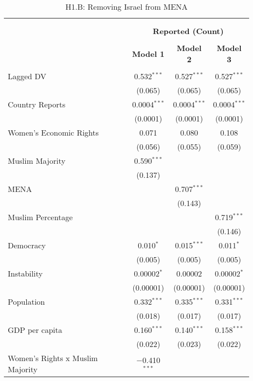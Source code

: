 
\begin{table}[!htbp] \centering 
  \caption{H1.B: Removing Israel from MENA} 
  \label{} 
\begin{tabular}{@{\extracolsep{5pt}}lccc} 
\\[-1.8ex]\hline \\[-1.8ex] 
\\[-1.8ex] & \multicolumn{3}{c}{\textbf{Reported (Count)}} \\ 
\\[-1.8ex] & \textbf{Model 1} & \textbf{Model 2} & \textbf{Model 3}\\ 
\hline \\[-1.8ex] 
 Lagged DV & 0.532$^{***}$ & 0.527$^{***}$ & 0.527$^{***}$ \\ 
  & (0.065) & (0.065) & (0.065) \\ 
  Country Reports & 0.0004$^{***}$ & 0.0004$^{***}$ & 0.0004$^{***}$ \\ 
  & (0.0001) & (0.0001) & (0.0001) \\ 
  Women's Economic Rights & 0.071 & 0.080 & 0.108 \\ 
  & (0.056) & (0.055) & (0.059) \\ 
  Muslim Majority & 0.590$^{***}$ &  &  \\ 
  & (0.137) &  &  \\ 
  MENA &  & 0.707$^{***}$ &  \\ 
  &  & (0.143) &  \\ 
  Muslim Percentage &  &  & 0.719$^{***}$ \\ 
  &  &  & (0.146) \\ 
  Democracy & 0.010$^{*}$ & 0.015$^{***}$ & 0.011$^{*}$ \\ 
  & (0.005) & (0.005) & (0.005) \\ 
  Instability & 0.00002$^{*}$ & 0.00002 & 0.00002$^{*}$ \\ 
  & (0.00001) & (0.00001) & (0.00001) \\ 
  Population & 0.332$^{***}$ & 0.335$^{***}$ & 0.331$^{***}$ \\ 
  & (0.018) & (0.017) & (0.017) \\ 
  GDP per capita & 0.160$^{***}$ & 0.140$^{***}$ & 0.158$^{***}$ \\ 
  & (0.022) & (0.023) & (0.022) \\ 
  Women's Rights x Muslim Majority & $-$0.410$^{***}$ &  &  \\ 

\end{tabular}
\end{table}
